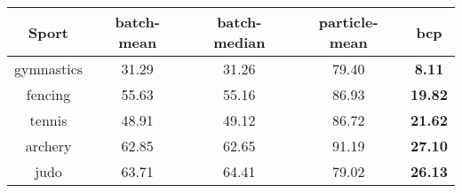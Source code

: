 \begin{tabular}{|c|c|c|c|c|}
\hline
Sport & batch-mean & batch-median & particle-mean & bcp \\
\hline
gymnastics & 31.29 & 31.26 & 79.40 & \textbf{8.11} \\
fencing & 55.63 & 55.16 & 86.93 & \textbf{19.82} \\
tennis & 48.91 & 49.12 & 86.72 & \textbf{21.62} \\
archery & 62.85 & 62.65 & 91.19 & \textbf{27.10} \\
judo & 63.71 & 64.41 & 79.02 & \textbf{26.13} \\
\hline
\end{tabular}

